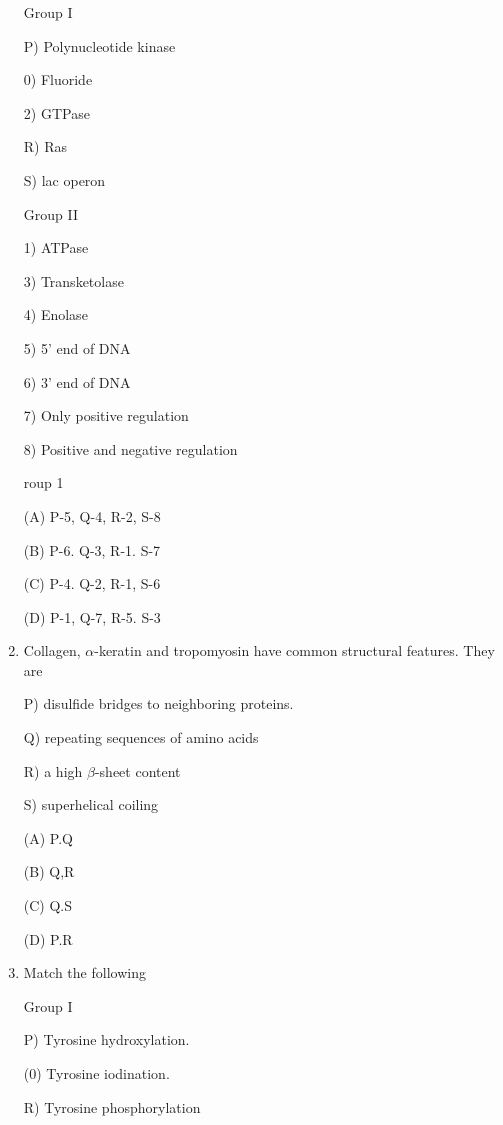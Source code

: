 \documentclass[journal]{IEEEtran}
\begin{document}
\begin{enumerate}
\begin{minipage}{0.5\textwidth}
\begin{flushleft}
Group I

P) Polynucleotide kinase

0) Fluoride

2) GTPase

R) Ras

S) lac operon

		\end{flushleft}
		\end{minipage}
	\begin{minipage}{0.5\textwidth}
		\begin{flushleft}
Group II

1) ATPase

3) Transketolase

4) Enolase

5) 5' end of DNA

6) 3' end of DNA

7) Only positive regulation

8) Positive and negative regulation
		\end{flushleft}
		\end{minipage}roup 1

(A) P-5, Q-4, R-2, S-8

(B) P-6. Q-3, R-1. S-7

(C) P-4. Q-2, R-1, S-6

(D) P-1, Q-7, R-5. S-3

\item{Collagen, $\alpha$-keratin and tropomyosin have common structural features. They are

P) disulfide bridges to neighboring proteins.

Q) repeating sequences of amino acids

R) a high $\beta$-sheet content

S) superhelical coiling

(A) P.Q

(B) Q,R

(C) Q.S

(D) P.R}

\item {Match the following}
	\newline
\begin{minipage}{0.5\textwidth}
	\begin{flushleft}


Group I

P) Tyrosine hydroxylation.

(0) Tyrosine iodination.

R) Tyrosine phosphorylation


\end{flushleft}
\end{minipage}
\end{enumerate}
\end{document}
